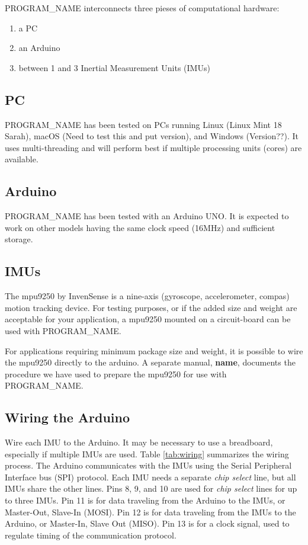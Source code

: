 \documentclass[11pt,letterpaper,article,oneside]{memoir}
\newcommand{\name}{PROGRAM\_NAME}
\begin{document}
\name{} interconnects three pieses of computational hardware:
\begin{enumerate}
  \item a PC
  \item an Arduino
  \item between 1 and 3 Inertial Measurement Units (IMUs)
\end{enumerate}

\subsection{PC}
\name{} has been tested on PCs running Linux (Linux Mint 18 Sarah), macOS (Need to test this and
put version), and Windows (Version??). It uses multi-threading and will perform
best if multiple processing units (cores) are available.

\subsection{Arduino}
\name{} has been tested with an Arduino UNO. It is expected to work on other
models having the same clock speed (16MHz) and sufficient storage.


\subsection{IMUs}
The mpu9250 by InvenSense is a nine-axis (gyroscope, accelerometer, compas)
motion tracking device.  For testing purposes, or if the added size and weight
are acceptable for your application, a mpu9250 mounted on a circuit-board can be
used with \name{}.

For applications requiring minimum package size and weight, it is possible to
wire the mpu9250 directly to the arduino. A separate manual, \textbf{name},
documents the procedure we have used to prepare the mpu9250 for use with
\name{}.


\subsection{Wiring the Arduino}
\label{sec:wiring}
Wire each IMU to the Arduino. It may be necessary to use a breadboard,
especially if multiple IMUs are used. Table \ref{tab:wiring} summarizes the
wiring process. The Arduino communicates with the IMUs using the Serial
Peripheral Interface bus (SPI) protocol. Each IMU needs a separate \emph{chip
select} line, but all IMUs share the other lines. Pins 8, 9, and 10 are used for
\emph{chip select} lines for up to three IMUs. Pin 11 is for data traveling from
the Arduino to the IMUs, or Master-Out, Slave-In (MOSI). Pin 12 is for data
traveling from the IMUs to the Arduino, or Master-In, Slave Out (MISO). Pin 13
is for a clock signal, used to regulate timing of the communication protocol. 
\end{document}
